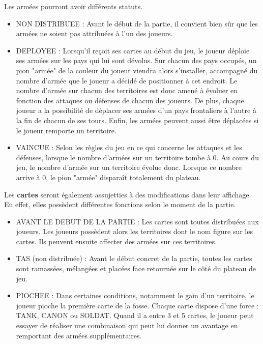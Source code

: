 Les armées pourront avoir différents statuts. 
\begin{itemize}
    \item NON DISTRIBUEE : Avant le début de la partie, il convient bien sûr que les armées ne soient pas attribuées à l'un des joueurs. 
    \item DEPLOYEE : Lorsqu'il reçoit ses cartes au début du jeu, le joueur déploie ses armées sur les pays qui lui sont dévolus. Sur chacun des pays occupés, un pion "armée" de la couleur du joueur viendra alors s'installer, accompagné du nombre d'armée que le joueur a décidé de positionner à cet endroit. Le nombre d'armée sur chacun des territoires est donc amené à évoluer en fonction des attaques ou défenses de chacun des joueurs. De plus, chaque joueur a la possibilité de déplacer ses armées d'un pays frontaliers à l'autre à la fin de chacun de ses tours. Enfin, les armées peuvent aussi être déplacées si le joueur remporte un territoire. 
    \item VAINCUE : Selon les règles du jeu en ce qui concerne les attaques et les défenses, lorsque le nombre d'armées sur un territoire tombe à 0. Au cours du jeu, le nombre d'armée sur un territoire évolue donc. Lorsque ce nombre arrive à 0, le pion "armée" disparaît totalement du plateau.  
    \newline
\end{itemize}

Les \textbf{cartes} seront également assujetties à des modifications dans leur affichage. En effet, elles possèdent différentes fonctions selon le moment de la partie.
\newline 

\begin{itemize}
    \item AVANT LE DEBUT DE LA PARTIE : Les cartes sont toutes distribuées aux joueurs. Les joueurs possèdent alors les territoires dont le nom figure sur les cartes. Ils peuvent ensuite affecter des armées sur ces territoires.
    \item TAS (non distribuée) : Avant le début concret de la partie, toutes les cartes sont ramassées, mélangées et placées face retournée sur le côté du plateau de jeu. 
    \item PIOCHEE : Dans certaines conditions, notamment le gain d'un territoire, le joueur pioche la première carte de la fosse. Chaque carte dispose d'une force : TANK, CANON ou SOLDAT. Quand il a entre 3 et 5 cartes, le joueur peut essayer de réaliser une combinaison qui peut lui donner un avantage en remportant des armées supplémentaires. 
\end{itemize}

